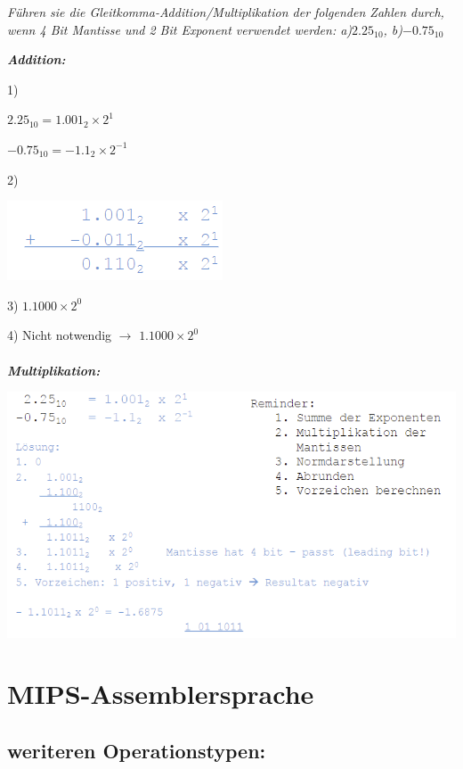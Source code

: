 \documentclass[fleqn]{article}
\begin{document}
\textit{Führen sie die Gleitkomma-Addition/Multiplikation der folgenden Zahlen durch, wenn 4 Bit Mantisse und 2 Bit Exponent verwendet werden: a)$2.25_{10}$, b)$-0.75_{10}$}

\textit{\textbf{Addition:}}

1)

\indent\indent$2.25_{10}=1.001_2\times 2^1$

\indent\indent$-0.75_{10}=-1.1_2\times 2^{-1}$

2)

\begin{center}
    \includegraphics[scale=0.5]{22.png}
\end{center}

3) $1.1000\times 2^0$

4) Nicht notwendig $\rightarrow$ $1.1000\times 2^0$
\\
\\
\indent\textit{\textbf{Multiplikation:}}

\begin{center}
    \includegraphics[scale=0.5]{23.png}
\end{center}

\section{MIPS-Assemblersprache}

\subsection{weriteren Operationstypen:}
\end{document}
